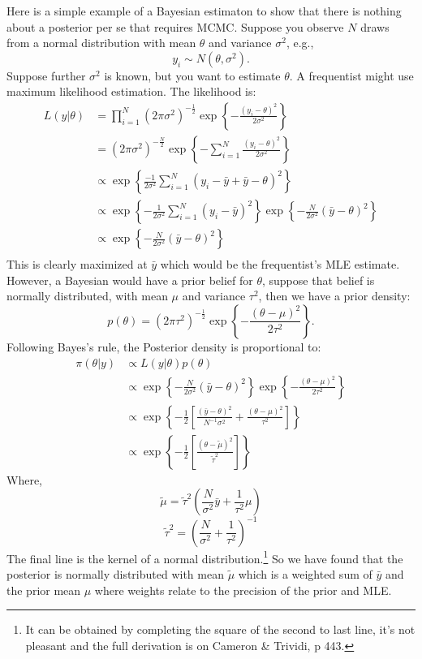 \documentclass[twoside]{article}
\begin{document}
Here is a simple example of a Bayesian estimaton to show that there is nothing about a posterior per se that requires MCMC.   Suppose you observe $N$ draws from 
a normal distribution with mean $\theta$ and variance $\sigma^2$, e.g., 
$$y_i \sim N(\theta, \sigma^2).$$ 
Suppose further $\sigma^2$ is known, but you want to estimate $\theta$. A frequentist might use maximum likelihood estimation. The likelihood is:
\begin{align*}
L(y|\theta) &= \prod_{i=1}^N (2\pi \sigma^2)^{- \frac{1}{2} } \exp \left\{ - \frac{(y_i - \theta)^2}{2 \sigma^2} \right\} \\
&= (2\pi \sigma^2)^{- \frac{N}{2} } \exp  \left\{ - \sum_{i=1}^N \frac{(y_i - \theta)^2}{2 \sigma^2} \right\} \\
& \propto  \exp  \left\{ \frac{-1}{2 \sigma^2}  \sum_{i=1}^N (y_i - \bar{y} +\bar{y} - \theta)^2 \right\} \\
&  \propto  \exp  \left\{ - \frac{1}{2 \sigma^2}  \sum_{i=1}^N (y_i - \bar{y})^2 \right\} \exp  \left\{ - \frac{N}{2 \sigma^2} (\bar{y} - \theta)^2 \right\} \\
&  \propto  \exp  \left\{ - \frac{N}{2 \sigma^2}   (\bar{y} - \theta)^2 \right\} \\
\end{align*}
This is clearly maximized at $\bar{y}$ which would be the frequentist's MLE estimate. However, a Bayesian would have a prior belief for $\theta$, suppose
that belief is normally distributed, with mean $\mu$ and variance $\tau^2$, then we have a prior density: 
$$p(\theta) =  (2\pi \tau^2)^{- \frac{1}{2} } \exp \left\{ - \frac{(\theta - \mu)^2}{2 \tau^2} \right\}.$$
Following Bayes's rule, the Posterior density is proportional to: 
\begin{align*}
\pi(\theta | y) & \propto L(y|\theta) p(\theta) \\
& \propto \exp  \left\{ - \frac{N}{2 \sigma^2}   (\bar{y} - \theta)^2 \right\} \exp \left\{ - \frac{(\theta - \mu)^2}{2 \tau^2} \right\} \\
& \propto \exp \left\{ - \frac{1}{2} \left[ \frac{  (\bar{y} - \theta)^2 }{N^{-1} \sigma^2} + \frac{(\theta - \mu)^2}{ \tau^2 } \right] \right\} \\
& \propto  \exp \left\{ - \frac{1}{2} \left[ \frac{ (\theta - \tilde{\mu})^2 }{\tilde{\tau}^2} \right] \right\}
\end{align*} 
Where,  
$$\tilde{\mu} = \tilde{\tau}^2 \left( \frac{N}{\sigma^2} \bar{y} + \frac{1}{\tau^2} \mu \right)$$
$$\tilde{\tau}^2 = \left(  \frac{N}{\sigma^2} + \frac{1}{\tau^2} \right)^{-1} $$
The final line is the kernel of a normal distribution.\footnote{It can be obtained by completing the square of the second to last line, it's not pleasant and
the full derivation is on Cameron \& Trividi, p 443.} So we have 
found that the posterior is normally distributed with mean $\tilde{\mu}$ which is a weighted sum of $\bar{y}$ and the prior mean $\mu$ where
weights relate to the precision of the prior and MLE. 
\end{document}

